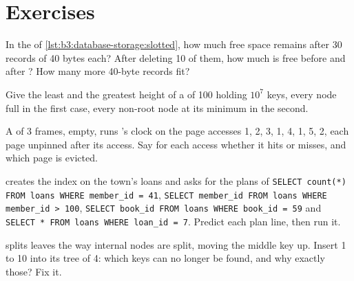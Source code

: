 \section{Exercises}\label{sec:b3:database-storage:exercises}

\begin{exercise}[$\star$]\label{exo:b3:database-storage:1}
In the  of \cref{lst:b3:database-storage:slotted}, how much free space remains after 30 records of 40 bytes each? After deleting 10 of them, how much is free before and after ? How many more 40-byte records fit?
\end{exercise}

\begin{exercise}[$\star$]\label{exo:b3:database-storage:2}
Give the least and the greatest height of a  of  100 holding $10^7$ keys, every node full in the first case, every non-root node at its minimum in the second.
\end{exercise}

\begin{exercise}[$\star$]\label{exo:b3:database-storage:3}
A  of 3 frames, empty, runs 's clock on the page accesses 1, 2, 3, 1, 4, 1, 5, 2, each page unpinned after its access. Say for each access whether it hits or misses, and which page is evicted.
\end{exercise}

\begin{exercise}[$\star$]\label{exo:b3:database-storage:4}
 creates the index  on the town's loans and asks for the plans of \texttt{SELECT count(*) FROM loans WHERE member\_id = 41}, \texttt{SELECT member\_id FROM loans WHERE member\_id > 100}, \texttt{SELECT book\_id FROM loans WHERE book\_id = 59} and \texttt{SELECT * FROM loans WHERE loan\_id = 7}. Predict each plan line, then run it.
\end{exercise}

\begin{exercise}[$\star\star$]\label{exo:b3:database-storage:5}
 splits leaves the way internal nodes are split, moving the middle key up. Insert 1 to 10 into its tree of  4: which keys can no longer be found, and why exactly those? Fix it.
\end{exercise}

